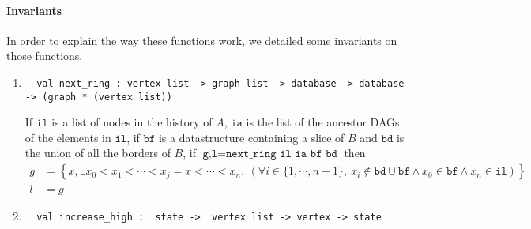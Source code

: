 \paragraph{Invariants} In order to explain the way these functions work, we detailed some invariants on those functions.
\begin{enumerate}
 \item \label{itm:first} 
 \begin{lstlisting}
  val next_ring : vertex list -> graph list -> database -> database -> (graph * (vertex list))
 \end{lstlisting}
 If $\texttt{il}$ is a list of nodes in the history of $A$, $\texttt{ia}$ is the list of the ancestor DAGs of the elements in $\texttt{il}$, if $\texttt{bf}$ is a datastructure containing a slice of $B$ and $\texttt{bd}$ is the union of all the borders of $B$, if $\texttt{g,l} = \texttt{next\_ring il ia bf bd}$ then 
 \begin{align*}
  g &= \left \{ x , \exists x_0 < x_1 < \cdots <x_j = x <\cdots< x_n ,\ (\forall i \in \{1,\cdots,n-1\},\ x_i \notin \texttt{bd}\cup\texttt{bf} \wedge x_0 \in \texttt{bf} \wedge x_n \in \texttt{il}) \right \}\\
  l &= \overline{g}
 \end{align*}

 \item 
 \begin{lstlisting}
  val increase_high :  state ->  vertex list -> vertex -> state
 \end{lstlisting}


\end{enumerate}
